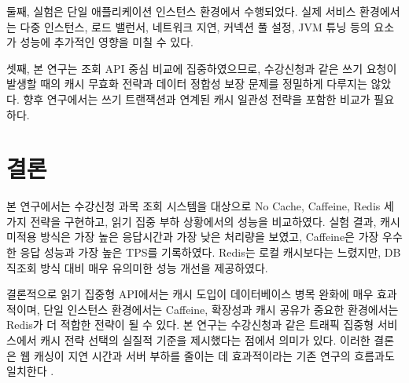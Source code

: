 \documentclass[10pt,a4paper,twocolumn]{article}
\begin{document}
둘째, 실험은 단일 애플리케이션 인스턴스 환경에서 수행되었다. 실제 서비스 환경에서는 다중 인스턴스, 로드 밸런서, 네트워크 지연, 커넥션 풀 설정, JVM 튜닝 등의 요소가 성능에 추가적인 영향을 미칠 수 있다.

셋째, 본 연구는 조회 API 중심 비교에 집중하였으므로, 수강신청과 같은 쓰기 요청이 발생할 때의 캐시 무효화 전략과 데이터 정합성 보장 문제를 정밀하게 다루지는 않았다. 향후 연구에서는 쓰기 트랜잭션과 연계된 캐시 일관성 전략을 포함한 비교가 필요하다.

\section{결론}

본 연구에서는 수강신청 과목 조회 시스템을 대상으로 No Cache, Caffeine, Redis 세 가지 전략을 구현하고, 읽기 집중 부하 상황에서의 성능을 비교하였다. 실험 결과, 캐시 미적용 방식은 가장 높은 응답시간과 가장 낮은 처리량을 보였고, Caffeine은 가장 우수한 응답 성능과 가장 높은 TPS를 기록하였다. Redis는 로컬 캐시보다는 느렸지만, DB 직조회 방식 대비 매우 유의미한 성능 개선을 제공하였다.

결론적으로 읽기 집중형 API에서는 캐시 도입이 데이터베이스 병목 완화에 매우 효과적이며, 단일 인스턴스 환경에서는 Caffeine, 확장성과 캐시 공유가 중요한 환경에서는 Redis가 더 적합한 전략이 될 수 있다. 본 연구는 수강신청과 같은 트래픽 집중형 서비스에서 캐시 전략 선택의 실질적 기준을 제시했다는 점에서 의미가 있다. 이러한 결론은 웹 캐싱이 지연 시간과 서버 부하를 줄이는 데 효과적이라는 기존 연구의 흐름과도 일치한다 \cite{wang1999survey}.

\balance
\small


\end{document}
